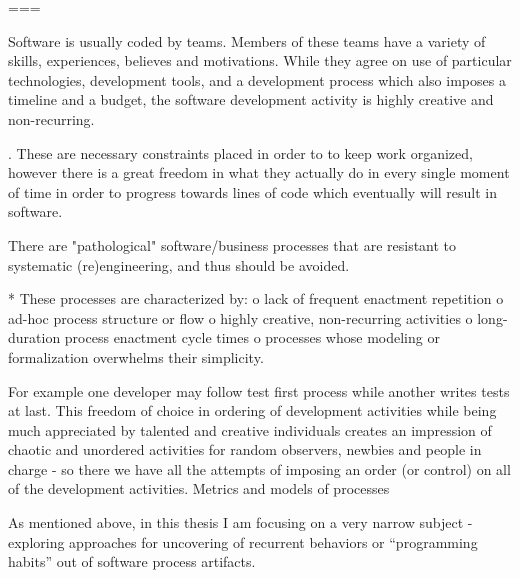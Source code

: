 ===

Software is usually coded by teams. Members of these teams have a variety of skills, experiences, 
believes and motivations. While they agree on use of particular technologies, development tools, 
and a development process which also imposes a timeline and a budget, the software development
activity is highly creative and non-recurring. 

. These are necessary constraints placed in order to to keep work organized, 
however there is a great freedom in what they actually do in every single moment of time in 
order to progress towards lines of code which eventually will result in software. 

There are "pathological" software/business processes that are resistant to systematic (re)engineering, and thus should be avoided.

    * These processes are characterized by:
          o lack of frequent enactment repetition
          o ad-hoc process structure or flow
          o highly creative, non-recurring activities
          o long-duration process enactment cycle times
          o processes whose modeling or formalization overwhelms their simplicity.

For example one developer may follow test first process while
another writes tests at last.  This freedom of choice in ordering of development activities 
while being much appreciated by talented and creative individuals creates an impression 
of chaotic and unordered activities for random observers, newbies and people in 
charge - so there we have all the attempts of imposing an order 
(or control) on all of the development activities. Metrics and models of processes


As mentioned above, in this thesis I am focusing on a very narrow subject - exploring approaches
for uncovering of recurrent behaviors or ``programming habits'' out of software process artifacts.








